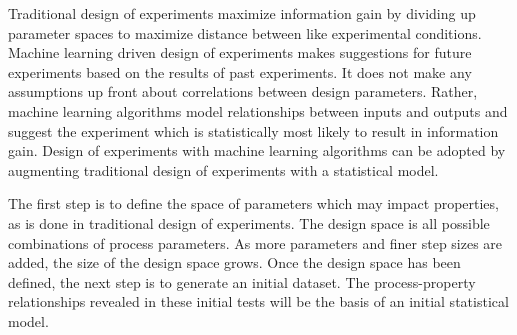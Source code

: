 Traditional design of experiments maximize information gain by dividing up parameter spaces to maximize distance between like experimental conditions. Machine learning driven design of experiments makes suggestions for future experiments based on the results of past experiments. It does not make any assumptions up front about correlations between design parameters. Rather, machine learning algorithms model relationships between inputs and outputs and suggest the experiment which is statistically most likely to result in information gain. Design of experiments with machine learning algorithms can be adopted by augmenting traditional design of experiments with a statistical model.

The first step is to define the space of parameters which may impact properties, as is done in traditional design of experiments. The design space is all possible combinations of process parameters. As more parameters and finer step sizes are added, the size of the design space grows. Once the design space has been defined, the next step is to generate an initial dataset. The process-property relationships revealed in these initial tests will be the basis of an initial statistical model. 

